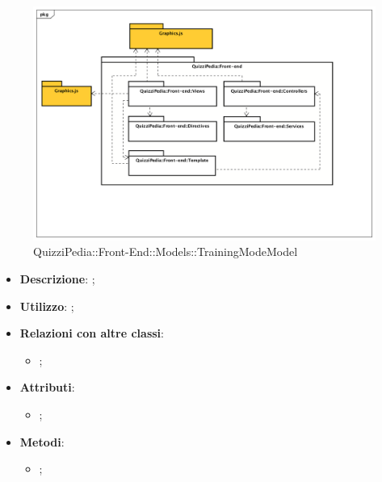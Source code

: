 			\begin{figure}[h]
				\centering
				\includegraphics[scale=0.5,keepaspectratio]{UML/Package/QuizziPedia_Front-end.png}
				\caption{QuizziPedia::Front-End::Models::TrainingModeModel}
			\end{figure}
			
			\begin{itemize}
				\item \textbf{Descrizione}: ;
				\item \textbf{Utilizzo}: ;
				\item \textbf{Relazioni con altre classi}: 
				\begin{itemize}
					\item ;
				\end{itemize}
				\item \textbf{Attributi}: 
				\begin{itemize}
					\item ;
				\end{itemize}
				\item \textbf{Metodi}: 
				\begin{itemize}
					\item ;
				\end{itemize}
			\end{itemize}																	